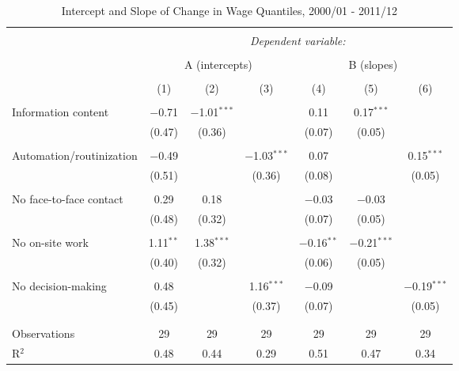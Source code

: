 

\begin{sidewaystable}[!htbp] \centering 
  \caption{Intercept and Slope of Change in Wage Quantiles, 2000/01 - 2011/12} 
  \label{tab:quantreg2} 
\begin{tabular}{@{\extracolsep{0pt}}lcccccc} 
\\[-1.8ex]\hline 
\hline \\[-1.8ex] 
 & \multicolumn{6}{c}{\textit{Dependent variable:}} \\ 
\cline{2-7} 
\\[-1.8ex] & \multicolumn{3}{c}{A (intercepts)} & \multicolumn{3}{c}{B (slopes)} \\ 
\\[-1.8ex] & (1) & (2) & (3) & (4) & (5) & (6)\\ 
\hline \\[-1.8ex] 
 Information content & $-$0.71 & $-$1.01$^{***}$ &  & 0.11 & 0.17$^{***}$ &  \\ 
  & (0.47) & (0.36) &  & (0.07) & (0.05) &  \\ 
  & & & & & & \\ 
 Automation/routinization & $-$0.49 &  & $-$1.03$^{***}$ & 0.07 &  & 0.15$^{***}$ \\ 
  & (0.51) &  & (0.36) & (0.08) &  & (0.05) \\ 
  & & & & & & \\ 
 No face-to-face contact & 0.29 & 0.18 &  & $-$0.03 & $-$0.03 &  \\ 
  & (0.48) & (0.32) &  & (0.07) & (0.05) &  \\ 
  & & & & & & \\ 
 No on-site work & 1.11$^{**}$ & 1.38$^{***}$ &  & $-$0.16$^{**}$ & $-$0.21$^{***}$ &  \\ 
  & (0.40) & (0.32) &  & (0.06) & (0.05) &  \\ 
  & & & & & & \\ 
 No decision-making & 0.48 &  & 1.16$^{***}$ & $-$0.09 &  & $-$0.19$^{***}$ \\ 
  & (0.45) &  & (0.37) & (0.07) &  & (0.05) \\ 
  & & & & & & \\ 
\hline \\[-1.8ex] 
Observations & 29 & 29 & 29 & 29 & 29 & 29 \\ 
R$^{2}$ & 0.48 & 0.44 & 0.29 & 0.51 & 0.47 & 0.34 \\ 

\end{tabular}
\end{sidewaystable}

